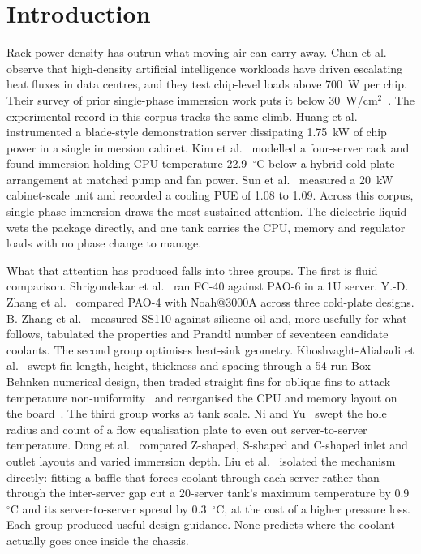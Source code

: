 \documentclass[preprint,12pt]{elsarticle}
\begin{document}
\section{Introduction}
\label{sec:introduction}

Rack power density has outrun what moving air can carry away. Chun et al.~\cite{chun2026} observe
that high-density artificial intelligence workloads have driven escalating heat fluxes in data
centres, and they test chip-level loads above 700~W per chip. Their survey of prior single-phase
immersion work puts it below 30~W/cm$^2$~\cite{chun2026}. The experimental record in this corpus
tracks the same climb. Huang et al.~\cite{huang2024energy} instrumented a blade-style
demonstration server dissipating 1.75~kW of chip power in a single immersion cabinet. Kim et
al.~\cite{kim2025} modelled a four-server rack and found immersion holding CPU temperature
22.9~$^{\circ}$C below a hybrid cold-plate arrangement at matched pump and fan power. Sun et
al.~\cite{sun2025} measured a 20~kW cabinet-scale unit and recorded a cooling PUE of 1.08 to 1.09.
Across this corpus, single-phase immersion draws the most sustained attention. The dielectric
liquid wets the package directly, and one tank carries the CPU, memory and regulator loads with
no phase change to manage.

What that attention has produced falls into three groups. The first is fluid comparison.
Shrigondekar et al.~\cite{shrigondekar2023} ran FC-40 against PAO-6 in a 1U server. Y.-D. Zhang et
al.~\cite{zhang2024pao4} compared PAO-4 with Noah@3000A across three cold-plate designs. B. Zhang
et al.~\cite{zhang2026} measured SS110 against silicone oil and, more usefully for what follows,
tabulated the properties and Prandtl number of seventeen candidate coolants. The second group
optimises heat-sink geometry. Khoshvaght-Aliabadi et al.~\cite{khoshvaghtaliabadi2025} swept fin
length, height, thickness and spacing through a 54-run Box-Behnken numerical design, then traded
straight fins for oblique fins to attack temperature non-uniformity~\cite{khoshvaghtaliabadi2026oblique}
and reorganised the CPU and memory layout on the board~\cite{khoshvaghtaliabadi2026component}. The
third group works at tank scale. Ni and Yu~\cite{ni2024} swept the hole radius and count of a flow
equalisation plate to even out server-to-server temperature. Dong et al.~\cite{dong2026} compared
Z-shaped, S-shaped and C-shaped inlet and outlet layouts and varied immersion depth. Liu et
al.~\cite{liu2024tank} isolated the mechanism directly: fitting a baffle that forces coolant
through each server rather than through the inter-server gap cut a 20-server tank's maximum
temperature by 0.9~$^{\circ}$C and its server-to-server spread by 0.3~$^{\circ}$C, at the cost of
a higher pressure loss. Each group produced useful design guidance. None predicts where the
coolant actually goes once inside the chassis.
\end{document}
